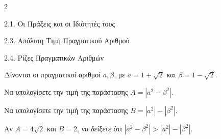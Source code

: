\begin{ylh}{2}
    \item 2.1. Οι Πράξεις και οι Ιδιότητές τους
    \item 2.3. Απόλυτη Τιμή Πραγματικού Αριθμού
    \item 2.4. Ρίζες Πραγματικών Αριθμών
\end{ylh}
Δίνονται οι πραγματικοί αριθμοί $a, \beta$, με $a = 1 + \sqrt{2}$ και $\beta = 1 - \sqrt{2}$.

\begin{alist}
\item Να υπολογίσετε την τιμή της παράστασης $A = |a^2 - \beta^2|$.
\item Να υπολογίσετε την τιμή της παράστασης $B = |a^2| - |\beta^2|$.
\item Αν $A = 4\sqrt{2}$ και $B = 2$, να δείξετε ότι $|a^2 - \beta^2| > |a^2| - |\beta^2|$.
\end{alist}

